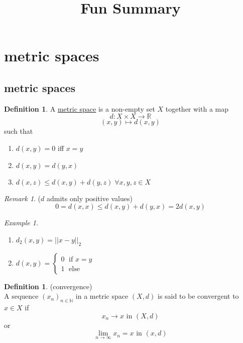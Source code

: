 \documentclass[a4paper, 12pt]{article}
\theoremstyle{plain}
\theoremstyle{definition}
\newtheorem{definition}[theorem]{Definition} %
\theoremstyle{lemma}
\theoremstyle{remark}
\newtheorem{remark}[theorem]{Remark}
\theoremstyle{corollary}
\theoremstyle{example}
\newtheorem{example}[theorem]{Example}
\begin{document}
	\begin{titlepage} 
		\title{Fun Summary}
		\clearpage\maketitle
		\thispagestyle{empty}
	\end{titlepage}
	\tableofcontents
	\newpage
	\section{metric spaces}
	\label{sec: metric spaces}
	\subsection{metric spaces}
	\begin{definition}
		A \underline{metric space} is a non-empty set $X$ together with a map \[d: X \times X \to \mathbb{R}\]
		\[(x,y) \mapsto d(x,y)\]
		such that \begin{enumerate}
			\item $d(x,y) = 0$ iff $x = y$
			\item $d(x,y) = d(y,x)$
			\item $d(x,z) \leq d(x,y) + d(y,z) \; \forall x,y,z \in X$
		\end{enumerate}
	\end{definition}

	\begin{remark}($d$ admits only positive values)\\
		\[0 = d(x,x) \leq d(x,y) + d(y,x) = 2d(x,y)\]
	\end{remark}

	\begin{example}
		\begin{enumerate}
			\item $d_2(x,y) = ||x-y||_2$
			\item $d(x,y) = \begin{cases}
				0 \; \text{ if } x = y\\
				1 \; \text{ else}
			\end{cases}$
		\end{enumerate}
	\end{example}
	
	\begin{definition} (convergence)\\
		A sequence $(x_n)_{n \in \mathbb{N}}$ in a metric space $(X,d)$ is said to be convergent to $x \in X$ if \[x_n \to x \text{ in } (X,d)\] or \[\lim\limits_{n \to \infty} x_n = x \text{ in } (x,d)\]
	\end{definition}
\end{document}
